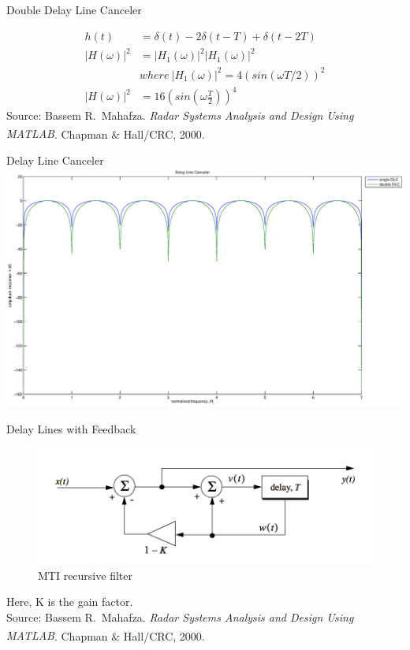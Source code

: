 \documentclass[mathserif]{beamer}
\begin{document}
    
    \begin{frame}{Double Delay Line Canceler}
      \begin{minipage}[t][0.8\textheight][t]{\textwidth}
	\begin{align}
	  h(t) & = \delta(t) - 2\delta(t-T) + \delta(t-2T) \nonumber \\
	  |H(\omega)|^2 & = |H_1(\omega)|^2|H_1(\omega)|^2 \nonumber \\
	  & where~ |H_1(\omega)|^2 = 4(sin(\omega T/2))^2 \nonumber \\
	  |H(\omega)|^2 & = 16\left(sin\left(\omega\frac{T}{2}\right)\right)^4 \nonumber
	\end{align}
	\vfill
    	\tiny{Source: Bassem R.~Mahafza. \emph{Radar Systems Analysis and Design Using MATLAB\textsuperscript{\textregistered}}. Chapman \& Hall/CRC, 2000.}
      \end{minipage}
    \end{frame}



    \begin{frame}{Delay Line Canceler}
    	\includegraphics[width=\linewidth]{delayLineCanceler}
    \end{frame}
    
    
    
    \begin{frame}{Delay Lines with Feedback}
      \begin{minipage}[t][0.8\textheight][t]{\textwidth}
	\begin{figure}[h]
		\centering
		\includegraphics[width=0.8\linewidth]{feedbackDLC} 
		\caption{MTI recursive filter}
	\end{figure}
	\vfill
	\tiny{Here, K is the gain factor.} \\
    	\tiny{Source: Bassem R.~Mahafza. \emph{Radar Systems Analysis and Design Using MATLAB\textsuperscript{\textregistered}}. Chapman \& Hall/CRC, 2000.}
      \end{minipage}
    \end{frame}
    
\end{document}
